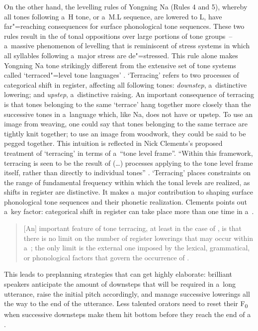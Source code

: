 On the other hand, the levelling rules of Yongning Na (Rules 4 and 5), whereby all tones following a~H tone, or a~M.L sequence, are lowered to L, have far"=reaching consequences for surface phonological tone sequences. These two rules result in the  of tonal oppositions over large portions of tone groups~-- a~massive phenomenon of levelling that is reminiscent of stress systems in which all syllables following a~major stress are de"=stressed. This rule alone makes Yongning Na tone strikingly different from the extensive set of tone systems called `terraced"=level tone languages' \citep{armstrong1968}. `Terracing' refers to two processes of categorical shift in register, affecting all following tones: \textit{downstep}, a~distinctive lowering; and \textit{upstep}, a~distinctive raising. An important consequence of terracing is that tones belonging to the same `terrace' hang together more closely than the successive tones in a~language which, like Na, does not have  or upstep. To use an image from weaving, one could say that tones belonging to the same terrace are tightly knit together; to use an image from woodwork, they could be said to be pegged together. This intuition is reflected in Nick Clements's proposed treatment of `terracing' in terms of a~``tone level frame''. ``Within this framework, terracing is seen to be the result of ({\dots}) processes applying to the tone level frame itself, rather than directly to individual tones'' \citep[538]{clements1979}. `Terracing' places constraints on the range of fundamental frequency within which the tonal levels are realized, as shifts in register are distinctive. It makes a~major contribution to shaping surface phonological tone sequences and their phonetic realization. Clements points out a~key factor: categorical shift in register can take place more than one time in a~. 

\begin{quotation}
	[An] important feature of tone terracing, at least in the case of , is that there is no limit on the number of register lowerings that may occur within a~; the only limit is the external one imposed by the lexical, grammatical, or phonological factors that govern the occurrence of . \citep[540]{clements1979}
\end{quotation}

{\noindent}This leads to preplanning strategies that can get highly elaborate: brilliant speakers anticipate the amount of downsteps that will be required in a~long utterance, raise the initial pitch accordingly, and manage successive lowerings all the way to the end of the utterance. Less talented orators need to reset their F\textsubscript{0} when successive downsteps make them hit bottom before they reach the end of a~ \citep{rialland2001}.

